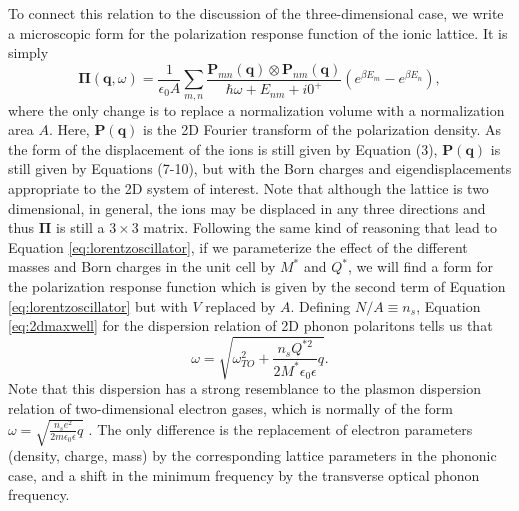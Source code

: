 \documentclass[aps,prb,twocolumn,
	groupedaddress,superscriptaddress,
	amsfonts,amssymb,amsmath,floatfix,
	citeautoscript]{revtex4-1}
\begin{document}
To connect this relation to the discussion of the three-dimensional case, we write a microscopic form for the polarization response function of the ionic lattice. It is simply
\begin{equation}\label{eq:2dsusceptibility}
\boldsymbol{\Pi}(\mathbf{q},\omega) =  \frac{1}{\epsilon_0 A}\sum\limits_{m,n}\frac{\mathbf{P}_{mn}(\mathbf{q})\otimes\mathbf{P}_{nm}(\mathbf{q})}{\hbar\omega + E_{nm}+i0^+}\left(e^{\beta E_m}-e^{\beta E_n} \right),
\end{equation}
where the only change is to replace a normalization volume with a normalization area $A$. Here, $\mathbf{P}(\mathbf{q})$ is the 2D Fourier transform of the polarization density. As the form of the displacement of the ions is still given by Equation (3), $\mathbf{P}(\mathbf{q})$ is still given by Equations (7-10), but with the Born charges and eigendisplacements appropriate to the 2D system of interest. Note that although the lattice is two dimensional, in general, the ions may be displaced in any three directions and thus $\boldsymbol{\Pi}$ is still a $3\times3$ matrix. Following the same kind of reasoning that lead to Equation \ref{eq:lorentzoscillator}, if we parameterize the effect of the different masses and Born charges in the unit cell by $M^*$ and $Q^*$, we will find a form for the polarization response function which is given by the second term of Equation \ref{eq:lorentzoscillator} but with $V$ replaced by $A$. Defining $N/A \equiv n_s$, Equation \ref{eq:2dmaxwell} for the dispersion relation of 2D phonon polaritons tells us that
\begin{equation}\label{eq:2dphononpolaritondispersion}
\omega = \sqrt{\omega_{TO}^2+\frac{n_sQ^{*2}}{2M^*\epsilon_0\epsilon}q}.
\end{equation}
Note that this dispersion has a strong resemblance to the plasmon dispersion relation of two-dimensional electron gases, which is normally of the form\cite{stern1967polarizability} $\omega = \sqrt{\frac{n_s e^2  }{2m\epsilon_0\epsilon}q}$ . The only difference is the replacement of electron parameters (density, charge, mass) by the corresponding lattice parameters in the phononic case, and a shift in the minimum frequency by the transverse optical phonon frequency. 
\end{document}
